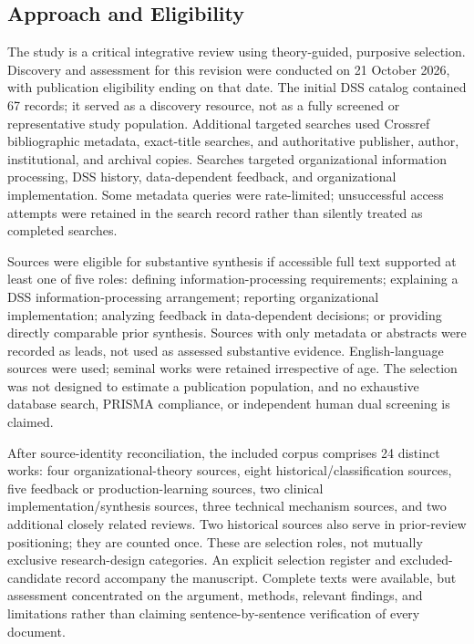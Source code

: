 \documentclass[journal]{IEEEtran}
\begin{document}
\subsection{Approach and Eligibility}
The study is a critical integrative review using theory-guided, purposive selection. Discovery and assessment for this revision were conducted on 21 October 2026, with publication eligibility ending on that date. The initial DSS catalog contained 67 records; it served as a discovery resource, not as a fully screened or representative study population. Additional targeted searches used Crossref bibliographic metadata, exact-title searches, and authoritative publisher, author, institutional, and archival copies. Searches targeted organizational information processing, DSS history, data-dependent feedback, and organizational implementation. Some metadata queries were rate-limited; unsuccessful access attempts were retained in the search record rather than silently treated as completed searches.

Sources were eligible for substantive synthesis if accessible full text supported at least one of five roles: defining information-processing requirements; explaining a DSS information-processing arrangement; reporting organizational implementation; analyzing feedback in data-dependent decisions; or providing directly comparable prior synthesis. Sources with only metadata or abstracts were recorded as leads, not used as assessed substantive evidence. English-language sources were used; seminal works were retained irrespective of age. The selection was not designed to estimate a publication population, and no exhaustive database search, PRISMA compliance, or independent human dual screening is claimed.

After source-identity reconciliation, the included corpus comprises 24 distinct works: four organizational-theory sources, eight historical/classification sources, five feedback or production-learning sources, two clinical implementation/synthesis sources, three technical mechanism sources, and two additional closely related reviews. Two historical sources also serve in prior-review positioning; they are counted once. These are selection roles, not mutually exclusive research-design categories. An explicit selection register and excluded-candidate record accompany the manuscript. Complete texts were available, but assessment concentrated on the argument, methods, relevant findings, and limitations rather than claiming sentence-by-sentence verification of every document.
\end{document}
